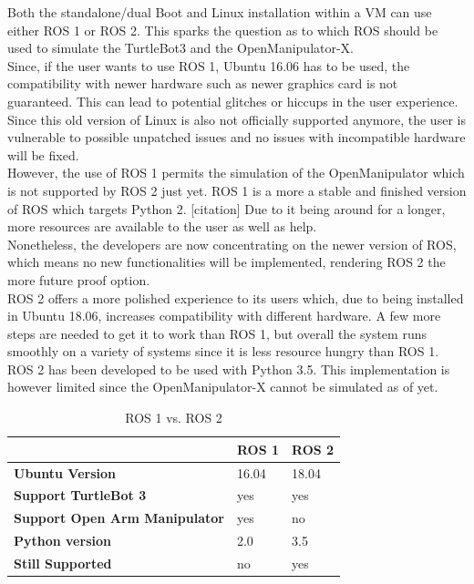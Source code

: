 \documentclass[plainarticle,zihtitle,english,final,hyperref,utf8]{zihpub}
\begin{document}
Both the standalone/dual Boot and Linux installation within a VM can use either ROS 1 or ROS 2. This sparks the question as to which ROS should be used to simulate the TurtleBot3 and the OpenManipulator-X.\\
\newline
Since, if the user wants to use ROS 1, Ubuntu 16.06 has to be used, the compatibility with newer hardware such as newer graphics card is not guaranteed. This can lead to potential glitches or hiccups in the user experience. Since this old version of Linux is also not officially supported anymore, the user is vulnerable to possible unpatched issues and no issues with incompatible hardware will be fixed.\\
However, the use of ROS 1 permits the simulation of the OpenManipulator which is not supported by ROS 2 just yet.
ROS 1 is a more a stable and finished version of ROS which targets Python 2. [citation] Due to it being around for a longer, more resources are available to the user as well as help.\\
\newline
Nonetheless, the developers are now concentrating on the newer version of ROS, which means no new functionalities will be implemented, rendering ROS 2 the more future proof option.\\
ROS 2 offers a more polished experience to its users which, due to being installed in Ubuntu 18.06, increases compatibility with different hardware. A few more steps are needed to get it to work than ROS 1, but overall the system runs smoothly on a variety of systems since it is less resource hungry than ROS 1. ROS 2 has been developed to be used with Python 3.5. This implementation is however limited since the OpenManipulator-X cannot be simulated as of yet. 

\begin{table}[h!]
\centering
\begin{tabular}{l|l|l}
 & \textbf{ROS 1} & \textbf{ROS 2} \\ \hline
\textbf{Ubuntu   Version} & 16.04 & 18.04 \\
\textbf{Support TurtleBot   3} & yes & yes \\
\textbf{Support Open   Arm Manipulator} & yes & no \\
\textbf{Python   version} & 2.0 & 3.5 \\
\textbf{Still Supported} & no & yes
\end{tabular}
\caption{ROS 1 vs. ROS 2}
\label{tab:ros1_vs_ros2}
\end{table}
\end{document}
